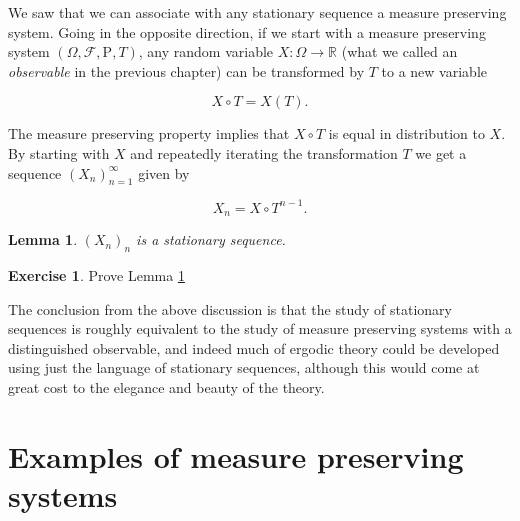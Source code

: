 \documentclass[11pt]{report}
\newcommand{\R}{\mathbb{R}}
\theoremstyle{plain}
\newtheorem{lem}[thm]{Lemma}
\theoremstyle{definition}
\newtheorem{xexercise}[thm]{Exercise}
\begin{document}
We saw that we can associate with any stationary sequence a measure preserving system. Going in the opposite direction, if we start with a measure preserving system $(\Omega, \mathcal{F}, \mathrm{P}, T)$, any random variable $X:\Omega\to\R$ (what we called an \emph{observable} in the previous chapter) can be transformed by $T$ to a new variable

\[
X\circ T = X(T).
\]

The measure preserving property implies that $X\circ T$ is equal in distribution to $X$. By starting with $X$ and repeatedly iterating the transformation $T$ we get a sequence $(X_n)_{n=1}^\infty$ given by

\[
X_n = X\circ T^{n-1}.
\]

\begin{lem}
\label{lem-mps-stationary}
$(X_n)_n$ is a stationary sequence.
\end{lem}

\begin{xexercise}
Prove Lemma \ref{lem-mps-stationary}
\end{xexercise}

The conclusion from the above discussion is that the study of stationary sequences is roughly equivalent to the study of measure preserving systems with a distinguished observable, and indeed much of ergodic theory could be developed using just the language of stationary sequences, although this would come at great cost to the elegance and beauty of the theory.

\section{Examples of measure preserving systems}
\end{document}
